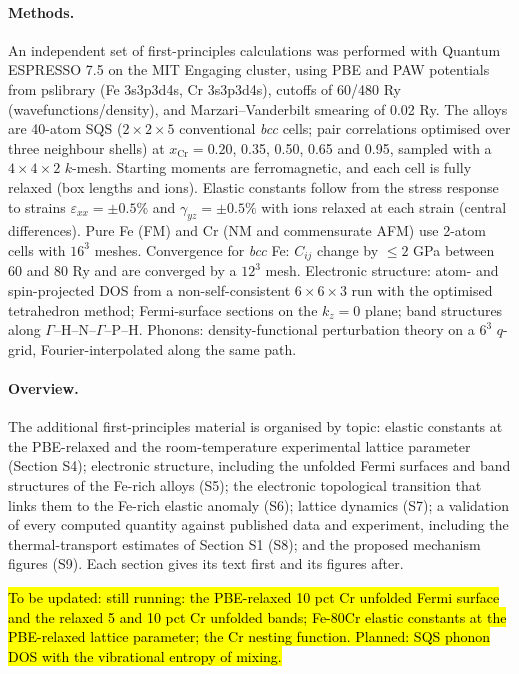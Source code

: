 \documentclass[final,3p,times]{elsarticle}
\DeclareRobustCommand{\upd}[1]{{\sethlcolor{yellow}\hl{To be updated: #1}}}
\begin{document}
\paragraph{Methods.} An independent set of first-principles calculations was performed with Quantum ESPRESSO 7.5 \cite{giannozzi2009quantum,giannozzi2017advanced} on the MIT Engaging cluster, using PBE \cite{pbe1996} and PAW potentials from pslibrary (Fe 3s3p3d4s, Cr 3s3p3d4s), cutoffs of 60/480 Ry (wavefunctions/density), and Marzari--Vanderbilt smearing of 0.02 Ry. The alloys are 40-atom SQS ($2\times2\times5$ conventional \textit{bcc} cells; pair correlations optimised over three neighbour shells) at $x_{\mathrm{Cr}}=0.20$, 0.35, 0.50, 0.65 and 0.95, sampled with a $4\times4\times2$ $k$-mesh. Starting moments are ferromagnetic, and each cell is fully relaxed (box lengths and ions). Elastic constants follow from the stress response to strains $\varepsilon_{xx}=\pm0.5\%$ and $\gamma_{yz}=\pm0.5\%$ with ions relaxed at each strain (central differences). Pure Fe (FM) and Cr (NM and commensurate AFM) use 2-atom cells with $16^3$ meshes. Convergence for \textit{bcc} Fe: $C_{ij}$ change by $\leq2$ GPa between 60 and 80 Ry and are converged by a $12^3$ mesh. Electronic structure: atom- and spin-projected DOS from a non-self-consistent $6\times6\times3$ run with the optimised tetrahedron method; Fermi-surface sections on the $k_z=0$ plane; band structures along $\Gamma$--H--N--$\Gamma$--P--H. Phonons: density-functional perturbation theory on a $6^3$ $q$-grid, Fourier-interpolated along the same path.

\paragraph{Overview.} The additional first-principles material is organised by topic: elastic constants at the PBE-relaxed and the room-temperature experimental lattice parameter (Section S4); electronic structure, including the unfolded Fermi surfaces and band structures of the Fe-rich alloys (S5); the electronic topological transition that links them to the Fe-rich elastic anomaly (S6); lattice dynamics (S7); a validation of every computed quantity against published data and experiment, including the thermal-transport estimates of Section S1 (S8); and the proposed mechanism figures (S9). Each section gives its text first and its figures after.

\upd{still running: the PBE-relaxed 10 pct Cr unfolded Fermi surface and the relaxed 5 and 10 pct Cr unfolded bands; Fe-80Cr elastic constants at the PBE-relaxed lattice parameter; the Cr nesting function. Planned: SQS phonon DOS with the vibrational entropy of mixing.}
\FloatBarrier
\clearpage
\end{document}
